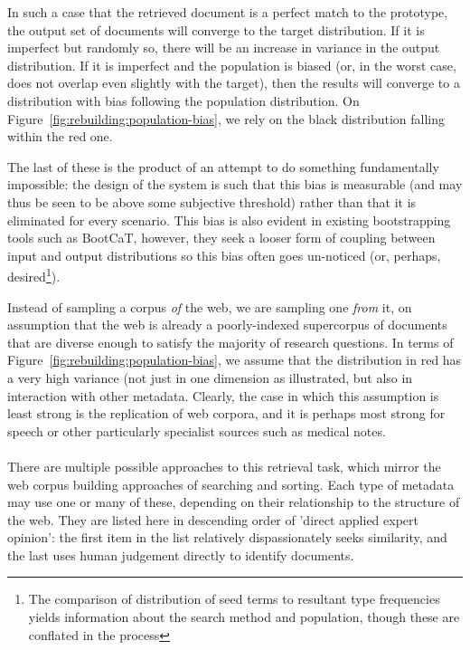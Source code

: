 In such a case that the retrieved document is a perfect match to the prototype, the output set of documents will converge to the target distribution.  If it is imperfect but randomly so, there will be an increase in variance in the output distribution.  If it is imperfect and the population is biased (or, in the worst case, does not overlap even slightly with the target), then the results will converge to a distribution with bias following the population distribution.  On Figure~\ref{fig:rebuilding:population-bias}, we rely on the black distribution falling within the red one.

The last of these is the product of an attempt to do something fundamentally impossible: the design of the system is such that this bias is measurable (and may thus be seen to be above some subjective threshold) rather than that it is eliminated for every scenario.  This bias is also evident in existing bootstrapping tools such as BootCaT, however, they seek a looser form of coupling between input and output distributions so this bias often goes un-noticed (or, perhaps, desired\footnote{The comparison of distribution of seed terms to resultant type frequencies yields information about the search method and population, though these are conflated in the process}).

Instead of sampling a corpus \textsl{of} the web, we are sampling one \textsl{from} it, on assumption that the web is already a poorly-indexed supercorpus of documents that are diverse enough to satisfy the majority of research questions.  In terms of Figure~\ref{fig:rebuilding:population-bias}, we assume that the distribution in red has a very high variance (not just in one dimension as illustrated, but also in interaction with other metadata.  Clearly, the case in which this assumption is least strong is the replication of web corpora, and it is perhaps most strong for speech or other particularly specialist sources such as medical notes.

\paragraph{}

There are multiple possible approaches to this retrieval task, which mirror the web corpus building approaches of searching and sorting.  Each type of metadata may use one or many of these, depending on their relationship to the structure of the web.  They are listed here in descending order of 'direct applied expert opinion': the first item in the list relatively dispassionately seeks similarity, and the last uses human judgement directly to identify documents.



